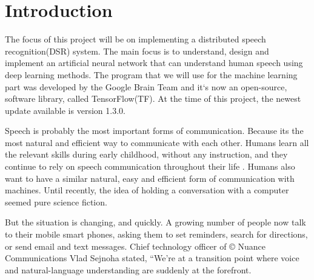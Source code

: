 \chapter{Introduction}\label{ch:introduction}

The focus of this project will be on implementing a distributed speech recognition(DSR) system.
 The main focus is to understand, design and implement an artificial neural network that can understand human speech using deep learning methods. 
 The program that we will use for the machine learning part was developed by the Google Brain Team and it`s now an open-source, software library, called TensorFlow(TF). 
 At the time of this project, the newest update available is version 1.3.0. \cite{tensorflow2015-whitepaper}

Speech is probably the most important forms of communication. Because its the most natural and efficient way to communicate with each other. Humans learn all the relevant skills during early childhood, without any instruction, and they continue to rely on speech communication throughout their life \cite{kamblespeech}. Humans also want to have a similar natural, easy and efficient form of communication with machines. Until recently, the idea of holding a conversation with a computer seemed pure science fiction.

But the situation is changing, and quickly. A growing number of people now talk to their mobile smart phones, asking them to set reminders, search for directions, or send email and text messages. Chief technology officer of \copyright{} Nuance Communications Vlad Sejnoha stated, “We’re at a transition point where voice and natural-language understanding are suddenly at the forefront.




\cite{kamblespeech}
 






